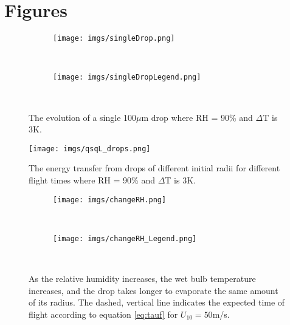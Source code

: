 \documentclass[10pt,a4paper]{article}
\begin{document}

\newpage
\section{Figures}
\begin{figure}[h!]
    \centering
    \begin{subfigure}[t!]{0.75\textwidth}
        \texttt{[image: imgs/singleDrop.png]}        
    \end{subfigure}
    ~ %
    \begin{subfigure}[t!]{0.2\textwidth}
        \texttt{[image: imgs/singleDropLegend.png]}        
    \end{subfigure}
    ~ %
       \caption{The evolution of a single 100$\mu$m drop where RH = 90\% and $\Delta$T is 3K.  }
       \label{fig:singleDrop}
\end{figure}

\begin{figure}[h!]
    \centering
        \texttt{[image: imgs/qsqL\_drops.png]}        
       \caption{The energy transfer from drops of different initial radii for different flight times where RH = 90\% and $\Delta$T is 3K. }
       \label{fig:qsqL}
\end{figure}

\begin{figure}[h!]
    \centering
    \begin{subfigure}[t!]{0.75\textwidth}
        \texttt{[image: imgs/changeRH.png]}        
    \end{subfigure}
    ~ %
    \begin{subfigure}[t!]{0.2\textwidth}
        \texttt{[image: imgs/changeRH\_Legend.png]}        
    \end{subfigure}
    ~ %
       \caption{As the relative humidity increases, the wet bulb temperature increases, and the drop takes longer to evaporate the same amount of its radius. The dashed, vertical line indicates the expected time of flight according to equation \ref{eq:tauf} for $U_{10} = 50$m/s.  \label{fig:changeRH}}
\end{figure}
\end{document}
